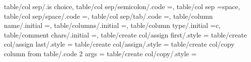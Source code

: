 {{{table/col sep/.is choice,
table/col sep/semicolon/.code                                      ={\def\pgfplotstableread@COLSEP@CASE{2}},                                                                                           
table/col sep                                                      =space,                                                                                                                             
table/col sep/space/.code                                          ={\def\pgfplotstableread@COLSEP@CASE{0}},                                                                                           
table/col sep/tab/.code                                            ={\def\pgfplotstableread@COLSEP@CASE{5}},                                                                                           
table/column name/.initial                                         =\pgfkeysnovalue,                                                                                                                   
table/columns/.initial                                             =,                                                                                                                                  
table/column type/.initial                                         ={c},                                                                                                                               
table/comment chars/.initial                                       =,                                                                                                                                  
table/create col/assign first/.style                               ={                                                                                                                                  
table/create col/assign last/.style                                ={                                                                                                                                  
table/create col/assign/.style                                     ={                                                                                                                                  
table/create col/copy column from table/.code 2 args               ={                                                                                                                                 
table/create col/copy/.style                                       ={                                                                                                                                 
}}}}}}}}
